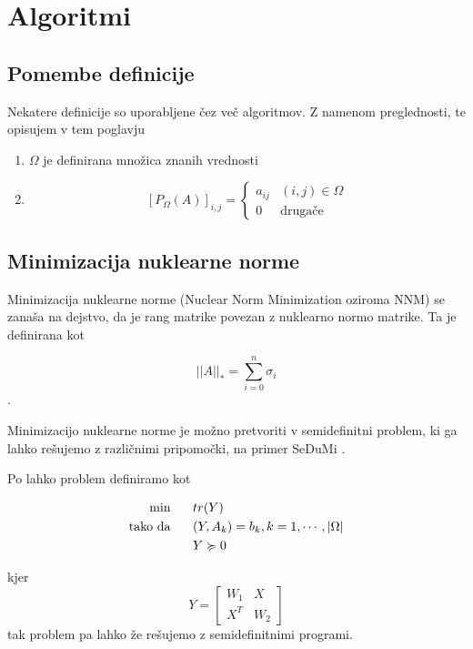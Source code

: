 \chapter{Algoritmi}

\section{Pomembe definicije}
Nekatere definicije so uporabljene čez več algoritmov. Z namenom preglednosti, te opisujem v tem poglavju
\begin{enumerate}
    \item $\Omega$ je definirana množica znanih vrednosti
    \item \[ [P_\Omega(A)]_{i,j} = \begin{cases} 
        a_{ij} & (i, j) \in \Omega \\
        0 & \textrm{drugače}
     \end{cases}
  \]
\end{enumerate}

\section{Minimizacija nuklearne norme}
Minimizacija nuklearne norme (Nuclear Norm Minimization oziroma NNM) se zanaša na dejstvo, da je rang matrike povezan z nuklearno normo matrike. Ta je definirana kot 

\[
||A||_* = \sum_{i = 0}^{n} \sigma_i
\].

Minimizacijo nuklearne norme je možno pretvoriti v semidefinitni problem, ki ga lahko rešujemo z različnimi pripomočki, na primer SeDuMi \cite{SeDuMi}.

Po \cite{CR08} lahko problem definiramo kot

\begin{align*}
    \textrm{min }& \hspace{0.5cm} tr(Y)\\
    \textrm{tako da }& \hspace{0.5cm} (Y, A_k) = b_k, k = 1, \cdots , |\Omega|\\
    &\hspace{0.5cm} Y \succcurlyeq 0
\end{align*}

kjer
\[
  Y = \begin{bmatrix}
    W_1 & X \\
    X^T & W_2
  \end{bmatrix}  
\] tak problem pa lahko že rešujemo z semidefinitnimi programi.


